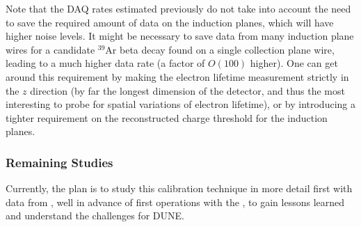

Note that the DAQ rates estimated previously do not take into account the need to save the required amount of data on the induction planes, which will have higher noise levels. It might be necessary to save data from many induction plane wires for a candidate ${}^{39}$Ar beta decay found on a single collection plane wire, leading to a much higher data rate (a factor of $O(100)$ higher). One can get around this requirement by making the electron lifetime measurement strictly in the $z$ direction (by far the longest dimension of the detector, and thus the most interesting to probe for spatial variations of electron lifetime), or by introducing a tighter requirement on the reconstructed charge threshold for the induction planes.

\subsubsection{Remaining Studies}
Currently, the plan is to study this calibration technique in more detail first with data from , well in advance of first operations with the , to %
gain lessons learned and understand the challenges for DUNE.



